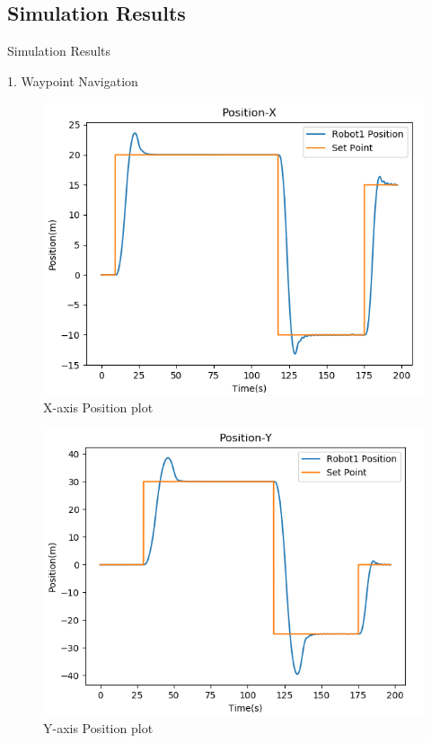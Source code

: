 \documentclass[10pt]{beamer}
\begin{document}
\subsection*{Simulation Results}
\begin{frame}{Simulation Results}
    \begin{description}
        \item[1. Waypoint Navigation]
    \end{description}{}
\begin{minipage}{0.47\textwidth}
     \begin{figure}[h!]
			\centering
			\includegraphics[scale=0.28]{Position-X-single.png} 
			\caption{X-axis Position plot }
			\label{Fig:pos_x}
		\end{figure}
	\end{minipage}
	\begin{minipage}{0.47\textwidth}
             \begin{figure}[h!]
			\centering
			\includegraphics[scale=0.28]{Position-Y-single.png} 
			\caption{Y-axis Position plot }
			\label{Fig:pos_y}
		\end{figure}
	\end{minipage}


\end{frame}
\end{document}
